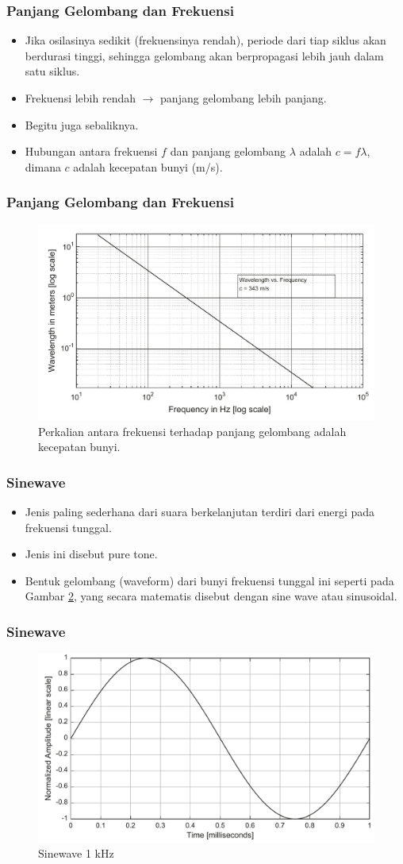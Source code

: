 \documentclass[pdflatex,compress]{beamer}
\begin{document}
\begin{frame}
	\frametitle{Panjang Gelombang dan Frekuensi}
	\begin{itemize}
		\item Jika osilasinya sedikit (frekuensinya rendah), periode dari tiap siklus akan berdurasi tinggi, sehingga gelombang akan berpropagasi lebih jauh dalam satu siklus.
		\item Frekuensi lebih rendah $\rightarrow$ panjang gelombang lebih panjang.
		\item Begitu juga sebaliknya.
		\item Hubungan antara frekuensi $ f $ dan panjang gelombang $ \lambda $ adalah $ c = f\lambda $, dimana $ c $ adalah kecepatan bunyi (m/s).
	\end{itemize}
\end{frame}

\begin{frame}
	\frametitle{Panjang Gelombang dan Frekuensi}
	\begin{figure}
		\centering
		\includegraphics[width=0.9\linewidth]{img/img002}
		\caption{Perkalian antara frekuensi terhadap panjang gelombang adalah kecepatan bunyi.}
		\label{fig:img002}
	\end{figure}
\end{frame}

\begin{frame}
	\frametitle{Sinewave}
	\begin{itemize}
		\item Jenis paling sederhana dari suara berkelanjutan terdiri dari energi pada frekuensi tunggal.
		\item Jenis ini disebut pure tone.
		\item Bentuk gelombang (waveform) dari bunyi frekuensi tunggal ini seperti pada Gambar \ref{fig:img003}, yang secara matematis disebut dengan sine wave atau sinusoidal.
	\end{itemize}
\end{frame}

\begin{frame}
	\frametitle{Sinewave}
	\begin{figure}
		\centering
		\includegraphics[width=0.7\linewidth]{img/img003}
		\caption{Sinewave 1 kHz}
		\label{fig:img003}
	\end{figure}
\end{frame}
\end{document}
